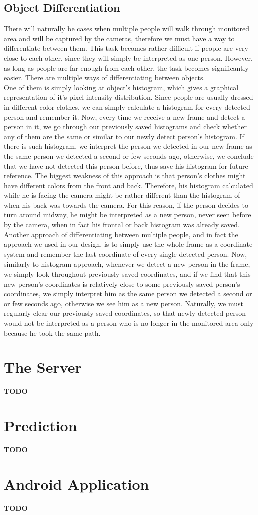 	\subsection{Object Differentiation}
	There will naturally be cases when multiple people will walk through monitored area and will be captured by the cameras, therefore we must have a way to differentiate between them. This task becomes rather difficult if people are very close to each other, since they will simply be interpreted as one person. However, as long as people are far enough from each other, the task becomes significantly easier. There are multiple ways of differentiating between objects. \\One of them is simply looking at object's histogram, which gives a graphical representation of it's pixel intensity distribution. Since people are usually dressed in different color clothes, we can simply calculate a histogram for every detected person and remember it. Now, every time we receive a new frame and detect a person in it, we go through our previously saved histograms and check whether any of them are the same or similar to our newly detect person's histogram. If there is such histogram, we interpret the person we detected in our new frame as the same person we detected a second or few seconds ago, otherwise, we conclude that we have not detected this person before, thus save his histogram for future reference. The biggest weakness of this approach is that person's clothes might have different colors from the front and back. Therefore, his histogram calculated while he is facing the camera might be rather different than the histogram of when his back was towards the camera. For this reason, if the person decides to turn around midway, he might be interpreted as a new person, never seen before by the camera, when in fact his frontal or back histogram was already saved. \\Another approach of differentiating between multiple people, and in fact the approach we used in our design, is to simply use the whole frame as a coordinate system and remember the last coordinate of every single detected person. Now, similarly to histogram approach, whenever we detect a new person in the frame, we simply look throughout previously saved coordinates, and if we find that this new person's coordinates is relatively close to some previously saved person's coordinates, we simply interpret him as the same person we detected a second or or few seconds ago, otherwise we see him as a new person. Naturally, we must regularly clear our previously saved coordinates, so that newly detected person would not be interpreted as a person who is no longer in the monitored area only because he took the same path. 	

\section{The Server}
{\color[rgb]{1,0,0} \textbf{\large TODO}}

\section{Prediction}
{\color[rgb]{1,0,0} \textbf{\large TODO}}

\section{Android Application}
{\color[rgb]{1,0,0} \textbf{\large TODO}}